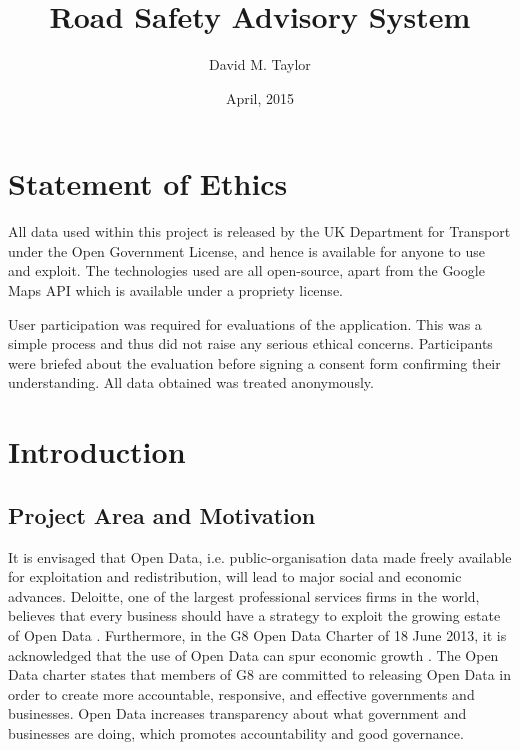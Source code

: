 \documentclass[authoryearcitations]{UoYCSproject}
\author{David M. Taylor}
\title{Road Safety Advisory System}
\date{April, 2015}
\begin{document}
\maketitle
\listoffigures
\listoftables
\renewcommand*{\lstlistlistingname}{List of Listings}

\cleardoublepage
\label{sec:start}
\thispagestyle{empty}\cleardoublepage

\chapter*{Statement of Ethics}
All data used within this project is released by the UK Department for Transport under the Open Government License, and hence is available for anyone to use and exploit. The technologies used are all open-source, apart from the Google Maps API which is available under a propriety license.

User participation was required for evaluations of the application. This was a simple process and thus did not raise any serious ethical concerns. Participants were briefed about the evaluation before signing a consent form confirming their understanding. All data obtained was treated anonymously.

\chapter{Introduction}

\section{Project Area and Motivation}

It is envisaged that Open Data, i.e. public-organisation data made freely available for exploitation and redistribution, will lead to major social and economic advances. Deloitte, one of the largest professional services firms in the world, believes that every business should have a strategy to exploit the growing estate of Open Data \citep{DeloitteAnalytics2012}. Furthermore, in the G8 Open Data Charter of 18 June 2013, it is acknowledged that the use of Open Data can spur economic growth \citep{CabinetOffice2013}. The Open Data charter states that members of G8 are committed to releasing Open Data in order to create more accountable, responsive, and effective governments and businesses. Open Data increases transparency about what government and businesses are doing, which promotes accountability and good governance.
\end{document}
